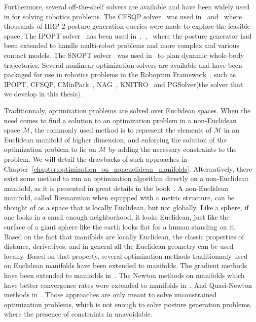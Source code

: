 Furthermore, several off-the-shelf solvers are available and have been widely used in for solving robotics problems.
The CFSQP solver~\cite{cfsqp:manual} was used in~\cite{escande:iros:2009} and~\cite{escande:ras:2013} where thousands of HRP-2 posture generation queries were made to explore the feasible space.
The IPOPT solver~\cite{wachter:mathprog:2006} has been used in~\cite{vaillant:humanoids:2014},~\cite{vaillant:autonomousrobots:2016},~\cite{bouyarmane:ar:2012} where the posture generator had been extended to handle multi-robot problems and more complex and various contact models.
The SNOPT solver~\cite{gill2005snopt} was used in~\cite{dai2014whole} to plan dynamic whole-body trajectories.
Several nonlinear optimization solvers are available and have been packaged for use in robotics problems in the Roboptim Framework~\cite{moulard:jsme:2013}, such as IPOPT, CFSQP, CMinPack~\cite{cminpack}, NAG~\cite{nag}, KNITRO~\cite{knitro} and PGSolver(the solver that we develop in this thesis).

Traditionnaly, optimization problems are solved over Euclidean spaces.
When the need comes to find a solution to an optimization problem in a non-Euclidean space $\mathcal{M}$, the commonly used method is to represent the elements of $\mathcal{M}$ in an Euclidean manifold of higher dimension, and enforcing the solution of the optimization problem to lie on $\mathcal{M}$ by adding the necessary constraints to the problem.
We will detail the drawbacks of such approaches in Chapter~\ref{chapter:optimization_on_noneuclidean_manifolds}.
Alternatively, there exist some method to run an optimization algorithm directly on a non-Euclidean manifold, as it is presented in great details in the book~\cite{absil:book:2008}.
A non-Euclidean manifold, called Riemannian when equipped with a metric structure, can be thought of as a space that is locally Euclidean, but not globally.
Like a sphere, if one looks in a small enough neighborhood, it looks Euclidean, just like the surface of a giant sphere like the earth looks flat for a human standing on it.
Based on the fact that manifolds are locally Euclidean, the classic properties of distance, derivatives, and in general all the Euclidean geometry can be used locally.
Based on that property, several optimization methods traditionnaly used on Euclidean manifolds have been extended to manifolds.
The gradient methods have been extended to manifolds in~\cite{luenberger1972gradient, gabay1982minimizing}.
The Newton methods on manifolds which have better convergence rates were extended to manifolds in~\cite{gabay1982minimizing, stuart1998dynamical, smith2013geometric}.
And Quasi-Newton methods in~\cite{gabay1982minimizing}.
Those approaches are only meant to solve unconstrained optimization problems, which is not enough to solve posture generation problems, where the presence of constraints in unavoidable.

